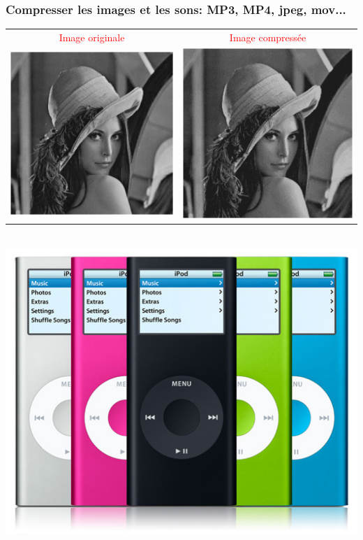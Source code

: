 \documentclass[slideopt,A4]{beamer}
\begin{document}
%
\begin{frame}
\frametitle{Compresser les images et les sons: MP3, MP4, jpeg, mov...}
%
\begin{center}
\begin{tabular}{cc}
\textcolor{red}{Image originale} & \textcolor{red}{Image compressée} \\
\includegraphics[width=0.40\linewidth]{lana-original.png} &
\includegraphics[width=0.40\linewidth]{lana-compresse.png}
\end{tabular}
\end{center}
%
\pause
%
\begin{center}
~\\[-10mm]
\includegraphics[width=0.4\linewidth]{ipod.jpg}
\end{center}
%
\end{frame}
%
\end{document}

